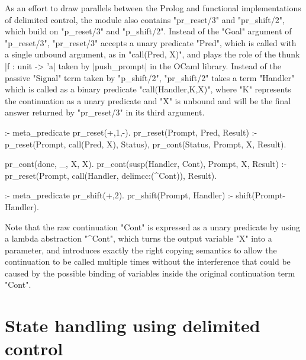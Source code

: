 As an effort to draw parallels between the Prolog and functional implementations of delimited
control, the module also contains "pr_reset/3" and "pr_shift/2", which build on "p_reset/3" and "p_shift/2".
Instead of the "Goal" argument of "p_reset/3", "pr_reset/3" accepts a unary predicate "Pred", which is
called with a single unbound argument, as in "call(Pred, X)", and plays the role of the thunk
|f : unit -> 'a| taken by |push_prompt| in the OCaml library. Instead of the passive "Signal" term
taken by "p_shift/2", "pr_shift/2" takes a term "Handler" which is called as
a binary predicate "call(Handler,K,X)", where "K" represents the continuation as a unary predicate 
and "X" is unbound and will be the final answer returned by "pr_reset/3" in its third argument.
\begin{prolog-framed}[name=delimcc, firstnumber=16]
  :- meta_predicate pr_reset(+,1,-).
  pr_reset(Prompt, Pred, Result) :-
     p_reset(Prompt, call(Pred, X), Status),
     pr_cont(Status, Prompt, X, Result).

  pr_cont(done, _, X, X).
  pr_cont(susp(Handler, Cont), Prompt, X, Result) :-
     pr_reset(Prompt, call(Handler, delimcc:(\X^Cont)), Result).

  :- meta_predicate pr_shift(+,2).
  pr_shift(Prompt, Handler) :- shift(Prompt-Handler).
\end{prolog-framed}
Note that the raw continuation "Cont" is expressed as a unary predicate 
by using a lambda abstraction "\X^Cont", which turns the output variable "X" into a parameter,
and introduces exactly the right copying semantics to allow the continuation to be
called multiple times without the interference that could be caused by the possible
binding of variables inside the original continuation term "Cont".

\section{State handling using delimited control}

